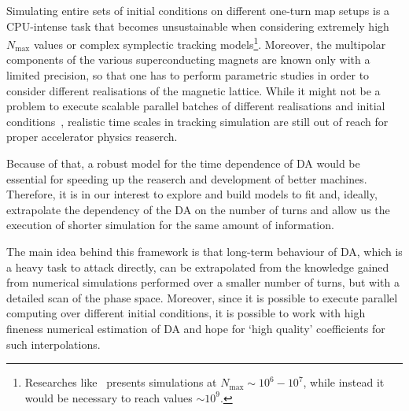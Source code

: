 
Simulating entire sets of initial conditions on different one-turn map setups is a CPU-intense task that becomes unsustainable when considering extremely high \(N_{\text{max}}\) values or complex symplectic tracking models\footnote{Researches like~\cite{giovannozzi1998dynamic} presents simulations at \(N_{\text{max}}\sim 10^6-10^7\), while instead it would be necessary to reach values \(\sim 10^9\).}. Moreover, the multipolar components of the various superconducting magnets are known only with a limited precision, so that one has to perform parametric studies in order to consider different realisations of the magnetic lattice. While it might not be a problem to execute scalable parallel batches of different realisations and initial conditions~\cite{giovannozzi1997development}, realistic time scales in tracking simulation are still out of reach for proper accelerator physics reaserch.

Because of that, a robust model for the time dependence of DA would be essential for speeding up the reaserch and development of better machines. Therefore, it is in our interest to explore and build models to fit and, ideally, extrapolate the dependency of the DA on the number of turns and allow us the execution of shorter simulation for the same amount of information.

The main idea behind this framework is that long-term behaviour of DA, which is a heavy task to attack directly, can be extrapolated from the knowledge gained from numerical simulations performed over a smaller number of turns, but with a detailed scan of the phase space. Moreover, since it is possible to execute parallel computing over different initial conditions, it is possible to work with high fineness numerical estimation of DA and hope for `high quality' coefficients for such interpolations.

